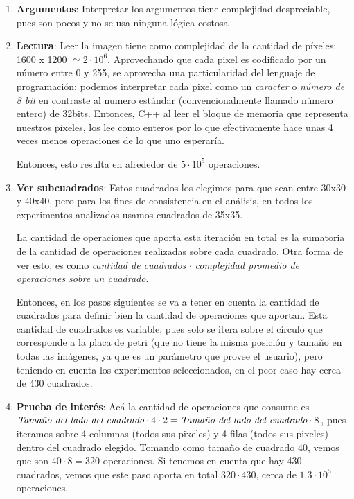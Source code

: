 \documentclass{article}
\begin{document}
\begin{enumerate}[topsep=0pt]
\item \textbf{Argumentos}: Interpretar los argumentos tiene complejidad despreciable, pues son pocos y no se usa ninguna lógica costosa

\item \textbf{Lectura}: Leer la imagen tiene como complejidad de la cantidad de píxeles: 1600 x 1200 $\simeq 2 \cdot 10^6$. Aprovechando que cada pixel es codificado por un número entre 0 y 255, se aprovecha una particularidad del lenguaje de programación: podemos interpretar cada pixel como un \emph{caracter} o \emph{número de 8 bit} en contraste al numero estándar (convencionalmente llamado número entero) de 32bits. Entonces, C++ al leer el bloque de memoria que representa nuestros pixeles, los lee como enteros por lo que efectivamente hace unas 4 veces menos operaciones de lo que uno esperaría.

\hspace{0.2cm} Entonces, esto resulta en alrededor de $5 \cdot 10^5$ operaciones.

\item \textbf{Ver subcuadrados}: Estos cuadrados los elegimos para que sean entre 30x30 y 40x40, pero para los fines de consistencia en el análisis, en todos los experimentos analizados usamos cuadrados de 35x35.

\hspace{0.2cm} La cantidad de operaciones que aporta esta iteración en total es la sumatoria de la cantidad de operaciones realizadas sobre cada cuadrado. Otra forma de ver esto, es como \emph{cantidad de cuadrados} $\cdot$ \emph{complejidad promedio de operaciones sobre un cuadrado}.

\hspace{0.2cm} Entonces, en los pasos siguientes se va a tener en cuenta la cantidad de cuadrados para definir bien la cantidad de operaciones que aportan. Esta cantidad de cuadrados es variable, pues solo se itera sobre el círculo que corresponde a la placa de petri (que no tiene la misma posición y tamaño en todas las imágenes, ya que es un parámetro que provee el usuario), pero teniendo en cuenta los experimentos seleccionados, en el peor caso hay cerca de 430 cuadrados.

\item \textbf{Prueba de interés}: Acá la cantidad de operaciones que consume es $\emph{Tamaño del lado del cuadrado} \cdot 4 \cdot 2 = \emph{Tamaño del lado del cuadrado} \cdot 8$, pues iteramos sobre 4 columnas (todos sus pixeles) y 4 filas (todos sus pixeles) dentro del cuadrado elegido. Tomando como tamaño de cuadrado 40, vemos que son $40\cdot8=320$ operaciones. Si tenemos en cuenta que hay 430 cuadrados, vemos que este paso aporta en total $320\cdot430$, cerca de $1.3 \cdot 10^5$ operaciones.


\end{enumerate}
\end{document}
